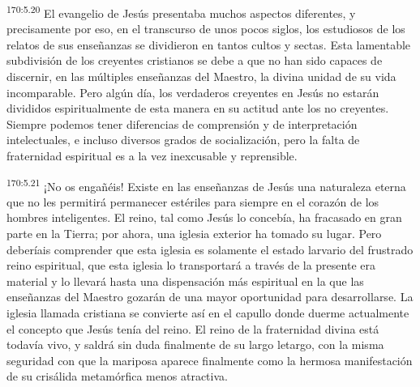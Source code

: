 \par 
\textsuperscript{170:5.20} El evangelio de Jesús presentaba muchos aspectos diferentes, y precisamente por eso, en el transcurso de unos pocos siglos, los estudiosos de los relatos de sus enseñanzas se dividieron en tantos cultos y sectas. Esta lamentable subdivisión de los creyentes cristianos se debe a que no han sido capaces de discernir, en las múltiples enseñanzas del Maestro, la divina unidad de su vida incomparable. Pero algún día, los verdaderos creyentes en Jesús no estarán divididos espiritualmente de esta manera en su actitud ante los no creyentes. Siempre podemos tener diferencias de comprensión y de interpretación intelectuales, e incluso diversos grados de socialización, pero la falta de fraternidad espiritual es a la vez inexcusable y reprensible.

\par 
\textsuperscript{170:5.21} ¡No os engañéis! Existe en las enseñanzas de Jesús una naturaleza eterna que no les permitirá permanecer estériles para siempre en el corazón de los hombres inteligentes. El reino, tal como Jesús lo concebía, ha fracasado en gran parte en la Tierra; por ahora, una iglesia exterior ha tomado su lugar. Pero deberíais comprender que esta iglesia es solamente el estado larvario del frustrado reino espiritual, que esta iglesia lo transportará a través de la presente era material y lo llevará hasta una dispensación más espiritual en la que las enseñanzas del Maestro gozarán de una mayor oportunidad para desarrollarse. La iglesia llamada cristiana se convierte así en el capullo donde duerme actualmente el concepto que Jesús tenía del reino. El reino de la fraternidad divina está todavía vivo, y saldrá sin duda finalmente de su largo letargo, con la misma seguridad con que la mariposa aparece finalmente como la hermosa manifestación de su crisálida metamórfica menos atractiva.